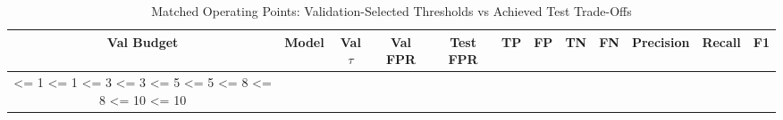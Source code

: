 \begin{table}[t]
\centering
\caption{Matched Operating Points: Validation-Selected Thresholds vs Achieved Test Trade-Offs}
\label{tab:matched_operating_points}
\begin{tabular}{clcccccccccc}
\toprule
\textbf{Val Budget} & \textbf{Model} & \textbf{Val $\tau$} & \textbf{Val FPR} & \textbf{Test FPR} & \textbf{TP} & \textbf{FP} & \textbf{TN} & \textbf{FN} & \textbf{Precision} & \textbf{Recall} & \textbf{F1} \\
\midrule
<= 1%
<= 1%
<= 3%
<= 3%
<= 5%
<= 5%
<= 8%
<= 8%
<= 10%
<= 10%
\bottomrule
\end{tabular}
\end{table}

